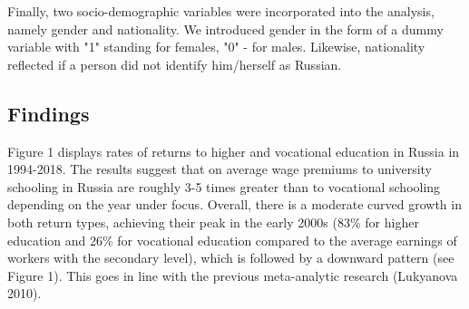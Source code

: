 \documentclass[12pt,a4paper]{article}
\begin{document}
Finally, two socio-demographic variables were incorporated into the analysis, namely gender and nationality. We introduced gender in the form of a dummy variable with "1" standing for females, "0" - for males. Likewise, nationality reflected if a person did not identify him/herself as Russian.

\subsection*{Findings}

Figure 1 displays rates of returns to higher and vocational education in Russia in 1994-2018. The results suggest that on average wage premiums to university schooling in Russia are roughly 3-5 times greater than to vocational schooling depending on the year under focus. Overall, there is a moderate curved growth in both return types, achieving their peak in the early 2000s (83\% for higher education and 26\% for vocational education compared to the average earnings of workers with the secondary level), which is followed by a downward pattern (see Figure 1). This goes in line with the previous meta-analytic research (Lukyanova 2010).
\\
\end{document}
